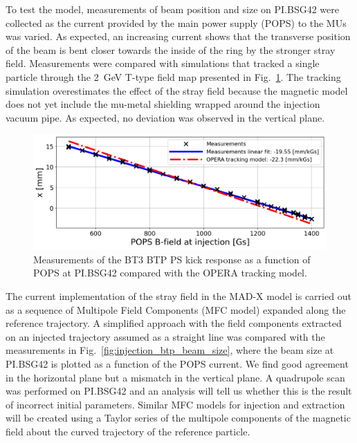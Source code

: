 To test the model, measurements of beam position and size on PI.BSG42 were collected as the current provided by the main power supply (POPS) to the MUs was varied. As expected, an increasing current shows that the transverse position of the beam is bent closer towards the inside of the ring by the stronger stray field. Measurements were compared with simulations that tracked a single particle through the \SI{2}{GeV} T-type field map presented in Fig.~\ref{fig:injection_btp_transverse_position}. The tracking simulation overestimates the effect of the stray field because the magnetic model does not yet include the mu-metal shielding wrapped around the injection vacuum pipe. As expected, no deviation was observed in the vertical plane.

\begin{figure}[!htb]
   \centering
   \includegraphics*[width=0.7\columnwidth]{01_Introduction/images/injection_measurement.png}
   \caption{Measurements of the BT3 BTP PS kick response as a function of POPS at PI.BSG42 compared with the OPERA tracking model.}
   \label{fig:injection_btp_transverse_position}
\end{figure}

The current implementation of the stray field in the \mbox{MAD-X}\cite{noauthor_mad_nodate} model is carried out as a sequence of Multipole Field Components (MFC model) expanded along the reference trajectory. A simplified approach with the field components extracted on an injected trajectory assumed as a straight line was compared with the measurements in Fig.~\ref{fig:injection_btp_beam_size}, where the beam size at PI.BSG42 is plotted as a function of the POPS current. We find good agreement in the horizontal plane but a mismatch in the vertical plane. A quadrupole scan was performed on PI.BSG42 and an analysis will tell us whether this is the result of incorrect initial parameters. Similar MFC models for injection and extraction will be created using a Taylor series of the multipole components of the magnetic field about the curved trajectory of the reference particle.

